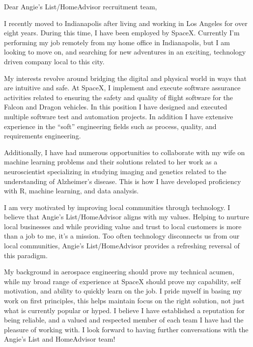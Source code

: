 \begin{cvletter}


Dear Angie's List/HomeAdvisor recruitment team,

I recently moved to Indianapolis after living and working in Los Angeles for
over eight years. During this time, I have been employed by SpaceX. Currently
I'm performing my job remotely from my home office in Indianapolis, but I am
looking to move on, and searching for new adventures in an exciting, technology
driven company local to this city.

My interests revolve around bridging the digital and physical world in ways that
are intuitive and safe. At SpaceX, I implement and execute software assurance
activities related to ensuring the safety and quality of flight software for the
Falcon and Dragon vehicles. In this position I have designed and executed
multiple software test and automation projects. In addition I have extensive
experience in the ``soft'' engineering fields such as process, quality, and
requirements engineering.

Additionally, I have had numerous opportunities to collaborate with my wife on
machine learning problems and their solutions related to her work as a
neuroscientist specializing in studying imaging and genetics related to the
understanding of Alzheimer's disease. This is how I have developed proficiency
with R, machine learning, and data analysis.




I am very motivated by improving local communities through technology. I believe
that Angie's List/HomeAdvisor aligns with my values. Helping to nurture local
businesses and while providing value and trust to local customers is more than a
job to me, it's a mission. Too often technology disconnects us from our local
communities, Angie's List/HomeAdvisor provides a refreshing reversal of this
paradigm.




My background in aerospace engineering should prove my technical acumen, while
my broad range of experience at SpaceX should prove my capability, self
motivation, and ability to quickly learn on the job. I pride myself in basing my
work on first principles, this helps maintain focus on the right solution, not
just what is currently popular or hyped. I believe I have established a
reputation for being reliable, and a valued and respected member of each team I
have had the pleasure of working with. I look forward to having further
conversations with the Angie's List and HomeAdvisor team!


\end{cvletter}


